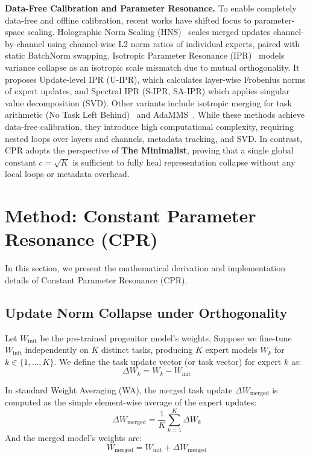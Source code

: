 \documentclass{article}
\theoremstyle{plain}
\theoremstyle{definition}
\theoremstyle{remark}
\begin{document}
\textbf{Data-Free Calibration and Parameter Resonance.}
To enable completely data-free and offline calibration, recent works have shifted focus to parameter-space scaling. Holographic Norm Scaling (HNS)~\cite{hns2025} scales merged updates channel-by-channel using channel-wise L2 norm ratios of individual experts, paired with static BatchNorm swapping. Isotropic Parameter Resonance (IPR)~\cite{ipr2025} models variance collapse as an isotropic scale mismatch due to mutual orthogonality. It proposes Update-level IPR (U-IPR), which calculates layer-wise Frobenius norms of expert updates, and Spectral IPR (S-IPR, SA-IPR) which applies singular value decomposition (SVD). Other variants include isotropic merging for task arithmetic (No Task Left Behind)~\cite{NoTaskLeft2025} and AdaMMS~\cite{AdammsModelMerging2025}. While these methods achieve data-free calibration, they introduce high computational complexity, requiring nested loops over layers and channels, metadata tracking, and SVD. In contrast, CPR adopts the perspective of \textbf{The Minimalist}, proving that a single global constant $c = \sqrt{K}$ is sufficient to fully heal representation collapse without any local loops or metadata overhead.

\section{Method: Constant Parameter Resonance (CPR)}
\label{sec:method}

In this section, we present the mathematical derivation and implementation details of Constant Parameter Resonance (CPR).

\subsection{Update Norm Collapse under Orthogonality}
Let $W_{\text{init}}$ be the pre-trained progenitor model's weights. Suppose we fine-tune $W_{\text{init}}$ independently on $K$ distinct tasks, producing $K$ expert models $W_k$ for $k \in \{1, \dots, K\}$. We define the task update vector (or task vector) for expert $k$ as:
\begin{equation}
\Delta W_k = W_k - W_{\text{init}}
\end{equation}

In standard Weight Averaging (WA), the merged task update $\Delta W_{\text{merged}}$ is computed as the simple element-wise average of the expert updates:
\begin{equation}
\Delta W_{\text{merged}} = \frac{1}{K} \sum_{k=1}^K \Delta W_k
\end{equation}
And the merged model's weights are:
\begin{equation}
W_{\text{merged}} = W_{\text{init}} + \Delta W_{\text{merged}}
\end{equation}
\end{document}
